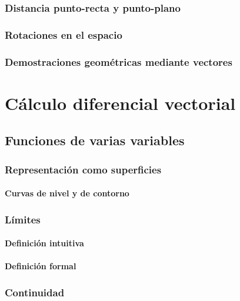 \documentclass[12pt, fleqn]{report}                             %
\begin{document}
		\section{Distancia punto-recta y punto-plano}
		
		\section{Rotaciones en el espacio}
		
		\section{Demostraciones geométricas mediante vectores}
			


\part{Cálculo diferencial vectorial}

	\chapter{Funciones de varias variables}
	
		\section{Representación como superficies}
		
			\subsection{Curvas de nivel y de contorno}
			
		\section{Límites}
			
			\subsection{Definición intuitiva}
			
			\subsection{Definición formal}
			
		\section{Continuidad}
		
\end{document}
